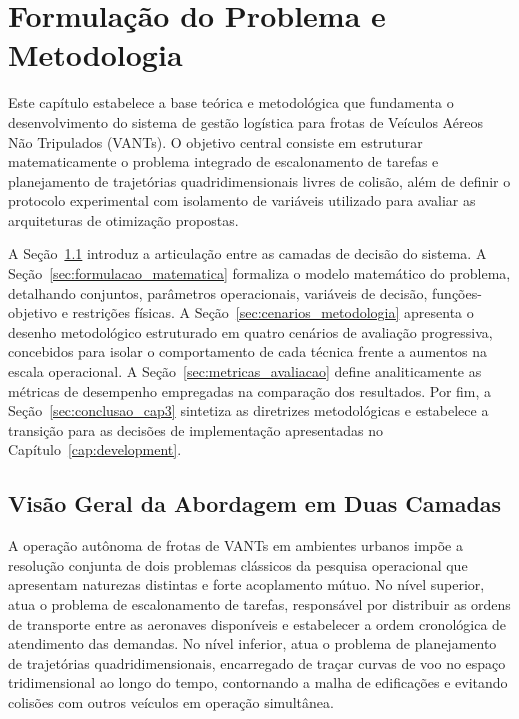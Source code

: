 \chapter{Formulação do Problema e Metodologia}\label{cap:metodology}

Este capítulo estabelece a base teórica e metodológica que fundamenta o desenvolvimento do sistema de gestão logística para frotas de Veículos Aéreos Não Tripulados (VANTs). O objetivo central consiste em estruturar matematicamente o problema integrado de escalonamento de tarefas e planejamento de trajetórias quadridimensionais livres de colisão, além de definir o protocolo experimental com isolamento de variáveis utilizado para avaliar as arquiteturas de otimização propostas.

A Seção~\ref{sec:visao_geral_problema} introduz a articulação entre as camadas de decisão do sistema. A Seção~\ref{sec:formulacao_matematica} formaliza o modelo matemático do problema, detalhando conjuntos, parâmetros operacionais, variáveis de decisão, funções-objetivo e restrições físicas. A Seção~\ref{sec:cenarios_metodologia} apresenta o desenho metodológico estruturado em quatro cenários de avaliação progressiva, concebidos para isolar o comportamento de cada técnica frente a aumentos na escala operacional. A Seção~\ref{sec:metricas_avaliacao} define analiticamente as métricas de desempenho empregadas na comparação dos resultados. Por fim, a Seção~\ref{sec:conclusao_cap3} sintetiza as diretrizes metodológicas e estabelece a transição para as decisões de implementação apresentadas no Capítulo~\ref{cap:development}.

\section{Visão Geral da Abordagem em Duas Camadas}\label{sec:visao_geral_problema}

A operação autônoma de frotas de VANTs em ambientes urbanos impõe a resolução conjunta de dois problemas clássicos da pesquisa operacional que apresentam naturezas distintas e forte acoplamento mútuo. No nível superior, atua o problema de escalonamento de tarefas, responsável por distribuir as ordens de transporte entre as aeronaves disponíveis e estabelecer a ordem cronológica de atendimento das demandas. No nível inferior, atua o problema de planejamento de trajetórias quadridimensionais, encarregado de traçar curvas de voo no espaço tridimensional ao longo do tempo, contornando a malha de edificações e evitando colisões com outros veículos em operação simultânea.

